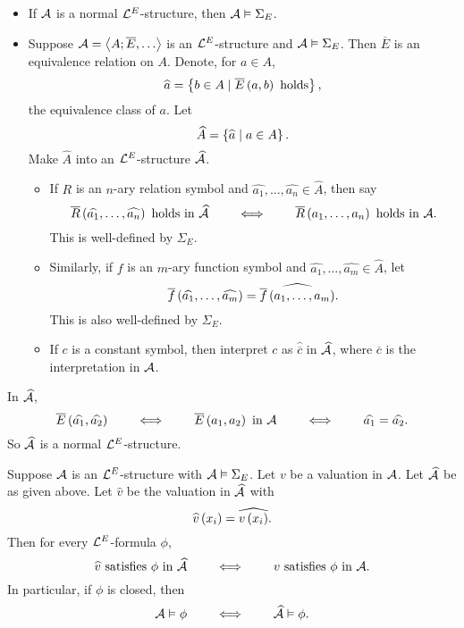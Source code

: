 \begin{remark}
\hfill
\begin{itemize}
\item If $ \AA $ is a normal $ \LL^E $-structure, then $ \AA \vDash \Sigma_E $.
\item Suppose $ \AA = \ab{A; \overline{E}, \dots} $ is an $ \LL^E $-structure and $ \AA \vDash \Sigma_E $. Then $ \overline{E} $ is an equivalence relation on $ A $. Denote, for $ a \in A $,
$$ \widehat{a} = \cb{b \in A \mid \overline{E}\rb{a, b} \ \text{holds}}, $$
the equivalence class of $ a $. Let
$$ \widehat{A} = \cb{\widehat{a} \mid a \in A}. $$
Make $ \widehat{A} $ into an $ \LL^E $-structure $ \widehat{\AA} $.
\begin{itemize}
\item If $ R $ is an $ n $-ary relation symbol and $ \widehat{a_1}, \dots, \widehat{a_n} \in \widehat{A} $, then say
$$ \overline{R}\rb{\widehat{a_1}, \dots, \widehat{a_n}} \ \text{holds in} \ \widehat{\AA} \qquad \iff \qquad \overline{R}\rb{a_1, \dots, a_n} \ \text{holds in} \ \AA. $$
This is well-defined by $ \Sigma_E $.
\item Similarly, if $ f $ is an $ m $-ary function symbol and $ \widehat{a_1}, \dots, \widehat{a_m} \in \widehat{A} $, let
$$ \overline{f}\rb{\widehat{a_1}, \dots, \widehat{a_m}} = \widehat{\overline{f}\rb{a_1, \dots, a_m}}. $$
This is also well-defined by $ \Sigma_E $.
\item If $ c $ is a constant symbol, then interpret $ c $ as $ \widehat{\overline{c}} $ in $ \widehat{\AA} $, where $ \overline{c} $ is the interpretation in $ \AA $.
\end{itemize}
\end{itemize}
\end{remark}

\begin{note*}
In $ \widehat{\AA} $,
$$ \overline{E}\rb{\widehat{a_1}, \widehat{a_2}} \qquad \iff \qquad \overline{E}\rb{a_1, a_2} \ \text{in} \ \AA \qquad \iff \qquad \widehat{a_1} = \widehat{a_2}. $$
So $ \widehat{\AA} $ is a normal $ \LL^E $-structure.
\end{note*}

\begin{lemma}
\label{lem:2.6.3}
Suppose $ \AA $ is an $ \LL^E $-structure with $ \AA \vDash \Sigma_E $. Let $ v $ be a valuation in $ \AA $. Let $ \widehat{\AA} $ be as given above. Let $ \widehat{v} $ be the valuation in $ \widehat{\AA} $ with
$$ \widehat{v}\rb{x_i} = \widehat{v\rb{x_i}}. $$
Then for every $ \LL^E $-formula $ \phi $,
$$ \widehat{v} \ \text{satisfies} \ \phi \ \text{in} \ \widehat{\AA} \qquad \iff \qquad v \ \text{satisfies} \ \phi \ \text{in} \ \AA. $$
In particular, if $ \phi $ is closed, then
$$ \AA \vDash \phi \qquad \iff \qquad \widehat{\AA} \vDash \phi. $$
\end{lemma}

